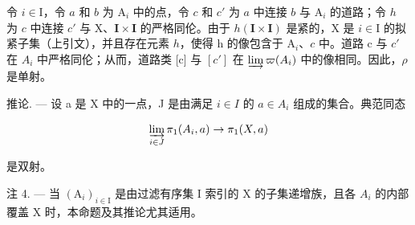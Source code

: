 令 \(i \in \mathrm{I}\)，令 \(a\) 和 \(b\) 为 \(\mathrm{A}_i\) 中的点，令 \(c\) 和 \(c'\) 为 \(a\) 中连接 \(b\) 与 \(\mathrm{A}_i\) 的道路；令 \(h\) 为 \(c\) 中连接 \(c'\) 与 \(\mathrm{X}\)、\(\mathbf{I} \times \mathbf{I}\) 的严格同伦。由于 \(h(\mathbf{I} \times \mathbf{I})\) 是紧的，\(\mathrm{X}\) 是 \(i \in \mathrm{I}\) 的拟紧子集（上引文），并且存在元素 \(h\)，使得 h 的像包含于 \(\mathrm{A}_i\)、\(c\) 中。道路 c 与 \(c'\) 在 \(A_{i}\) 中严格同伦；从而，道路类 {[}c{]} 与 \([c']\) 在 \(\varinjlim\varpi(A_{i})\) 中的像相同。因此，\(\rho\) 是单射。

推论. --- 设 a 是 X 中的一点，J 是由满足 \(i \in I\) 的 \(a \in A_{i}\) 组成的集合。典范同态

\[
\varinjlim_ {i \in J} \pi_ {1} (A _ {i}, a) \to \pi_ {1} (X, a)
\]

是双射。

注 4. --- 当 \((\mathrm{A}_{i})_{i\in\mathrm{I}}\) 是由过滤有序集 I 索引的 X 的子集递增族，且各 \(A_{i}\) 的内部覆盖 X 时，本命题及其推论尤其适用。


